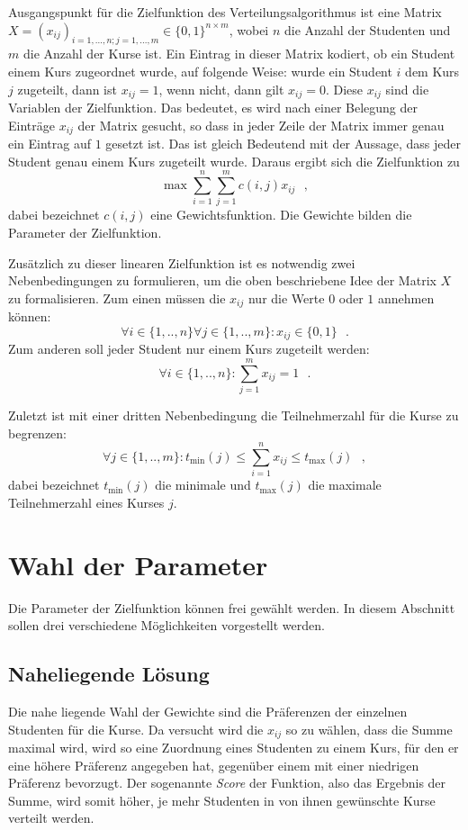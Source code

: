         Ausgangspunkt für die Zielfunktion des Verteilungsalgorithmus ist eine Matrix $ X = (x_{ij})_{i=1,...,n;j=1,...,m} \in \{0,1\}^{n \times m}$, wobei $ n $ die Anzahl der Studenten und $ m $ die Anzahl der Kurse ist.
        Ein Eintrag in dieser Matrix kodiert, ob ein Student einem Kurs zugeordnet wurde, auf folgende Weise:
        wurde ein Student $ i $ dem Kurs $ j $ zugeteilt, dann ist $ x_{ij} = 1 $, wenn nicht, dann gilt $ x_{ij} = 0 $. 
        Diese $ x_{ij} $ sind die Variablen der Zielfunktion.
        Das bedeutet, es wird nach einer Belegung der Einträge $ x_{ij} $ der Matrix gesucht, so dass in jeder Zeile der Matrix immer genau ein Eintrag auf $ 1 $ gesetzt ist.
        Das ist gleich Bedeutend mit der Aussage, dass jeder Student genau einem Kurs zugeteilt wurde.
        Daraus ergibt sich die Zielfunktion zu
            $$ \max \sum_{i=1}^{n} \sum_{j=1}^{m} c(i,j)x_{ij}  ~~~,$$
        dabei bezeichnet $ c(i,j) $ eine Gewichtsfunktion.
        Die Gewichte bilden die Parameter der Zielfunktion.
        
        Zusätzlich zu dieser linearen Zielfunktion ist es notwendig zwei Nebenbedingungen zu formulieren, um die oben beschriebene Idee der Matrix $ X $ zu formalisieren.
        Zum einen müssen die $ x_{ij} $ nur die Werte $ 0 $ oder $ 1 $ annehmen können:
            $$\forall {i \in \{1,..,n\}} \forall {j \in \{1,..,m\}}:  x_{ij} \in \{0,1\} ~~~.$$
        Zum anderen soll jeder Student nur einem Kurs zugeteilt werden:
            $$ \forall {i \in \{1,..,n\}}: \sum_{j=1}^{m} x_{ij} = 1 ~~~.$$
        
        Zuletzt ist mit einer dritten Nebenbedingung die Teilnehmerzahl für die Kurse zu begrenzen:
             $$ \forall {j \in \{1,..,m\}}: t_{\min}(j) \leq \sum_{i=1}^{n} x_{ij} \leq t_{\max}(j) ~~~,$$
        dabei bezeichnet $ t_{\min}(j) $ die minimale und $ t_{\max}(j) $ die maximale Teilnehmerzahl eines Kurses $ j $.
        
    \section{Wahl der Parameter}
        Die Parameter der Zielfunktion können frei gewählt werden.
        In diesem Abschnitt sollen drei verschiedene Möglichkeiten vorgestellt werden.
        
        \subsection{Naheliegende Lösung}
            Die nahe liegende Wahl der Gewichte sind die Präferenzen der einzelnen Studenten für die Kurse.
            Da versucht wird die $ x_{ij} $ so zu wählen, dass die Summe maximal wird, wird so eine Zuordnung eines Studenten zu einem Kurs, für den er eine höhere Präferenz angegeben hat, gegenüber einem mit einer niedrigen Präferenz bevorzugt.
            Der sogenannte \textit{Score} der Funktion, also das Ergebnis der Summe, wird somit höher, je mehr Studenten in von ihnen gewünschte Kurse verteilt werden.
            
